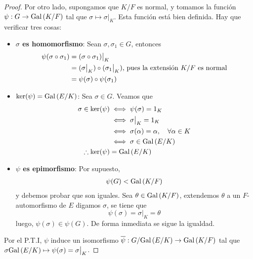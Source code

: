 \documentclass[12pt]{report}
\theoremstyle{largebreak}
\newcommand\cf[3]{\ensuremath{#1:#2\rightarrow#3}}
\begin{document}
\begin{proof}
        Por otro lado, supongamos que $K/F$ es normal, y tomamos la función $\cf{\psi}{G}{\Gal{K/F}}$ tal que $\sigma\mapsto\sigma\big|_K$. Esta función está bien definida. Hay que verificar tres cosas:
        \begin{itemize}
            \item \textbf{$\sigma$ es homomorfismo}: Sean $\sigma,\sigma_1\in G$, entonces
            \begin{equation*}
                \begin{split}
                    \psi(\sigma\circ\sigma_1)&=(\sigma\circ\sigma_1)\big|_K\\
                    &=(\sigma\big|_K)\circ(\sigma_1\big|_K)\textup{, pues la extensión $K/F$ es normal}\\
                    &=\psi(\sigma)\circ\psi(\sigma_1)\\
                \end{split}
            \end{equation*}
            \item $\ker(\psi)=\textup{Gal}\left(E/K\right)$: Sea $\sigma\in G$. Veamos que
            \begin{equation*}
                \begin{split}
                    \sigma\in\ker(\psi)&\iff \psi(\sigma)=1_K \\
                    &\iff \sigma\big|_K=1_K\\
                    &\iff\sigma(\alpha)=\alpha,\quad\forall \alpha\in K\\
                    &\iff \sigma\in\textup{Gal}\left(E/K\right)\\
                    \therefore \ker(\psi)&=\textup{Gal}\left(E/K\right)\\
                \end{split}
            \end{equation*}
            \item \textbf{$\psi$ es epimorfismo}: Por supuesto,
            \begin{equation*}
                \begin{split}
                    \psi(G)<\textup{Gal}\left(K/F\right)
                \end{split}
            \end{equation*}
            y debemos probar que son iguales. Sea $\theta\in\textup{Gal}\left(K/F\right)$, extendemos $\theta$ a un $F$-automorfismo de $E$ digamos $\sigma$, se tiene que
            \begin{equation*}
                \psi(\sigma)=\sigma\big|_K=\theta
            \end{equation*}
            luego, $\psi(\sigma)\in\psi(G)$. De forma inmediata se sigue la igualdad.
        \end{itemize}
        Por el P.T.I, $\psi$ induce un isomorfismo $\cf{\overline{\psi}}{G/\Gal{E/K}}{\Gal{K/F}}$ tal que $\sigma\textup{Gal}\left(E/K\right)\mapsto\psi(\sigma)=\sigma\big|_K$.
    \end{proof}
\end{document}
